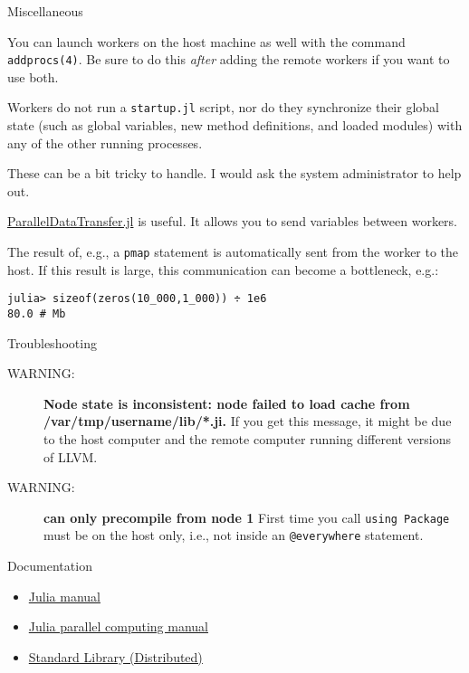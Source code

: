 \documentclass[10pt]{beamer}
\begin{document}
\begin{frame}[fragile]{Miscellaneous}
    \begin{description}[<+->]
	\item[Host machine workers] You can launch workers on the host machine as well with the command \texttt{addprocs(4)}. Be sure to do this \emph{after} adding the remote workers if you want to use both.
	\item[Startup script] Workers do not run a \texttt{startup.jl} script, nor do they synchronize their global state (such as global variables, new method definitions, and loaded modules) with any of the other running processes.
	\item[Non-Julia dependencies] These can be a bit tricky to handle. I would ask the system administrator to help out.
	\item[Sending data between workers] \href{https://github.com/ChrisRackauckas/ParallelDataTransfer.jl}{ParallelDataTransfer.jl} is useful. It allows you to send variables between workers.
	\item[The result of a parallel computation] The result of, e.g., a \texttt{pmap} statement is automatically sent from the worker to the host. If this result is large, this communication can become a bottleneck, e.g.:
	\begin{verbatim}
julia> sizeof(zeros(10_000,1_000)) ÷ 1e6
80.0 # Mb
	\end{verbatim}

\end{description}

\end{frame}


\begin{frame}{Troubleshooting}
\begin{description}
	\item[WARNING:] \textbf{Node state is inconsistent: node failed to load cache from /var/tmp/username/lib/*.ji.} If you get this message, it might be due to the host computer and the remote computer running different versions of LLVM.
	\item[WARNING:] \textbf{can only precompile from node 1} First time you call \texttt{using Package} must be on the host only, i.e., not inside an \texttt{@everywhere} statement.
\end{description}

\end{frame}


\begin{frame}{Documentation}
\begin{itemize}
	\item \href{https://docs.julialang.org/en/v1/}{Julia manual}
	\item \href{https://docs.julialang.org/en/v1/manual/parallel-computing/}{Julia parallel computing manual}
	\item \href{https://docs.julialang.org/en/v1/stdlib/Distributed/}{Standard Library (Distributed)}
\end{itemize}


\end{frame}
\end{document}

